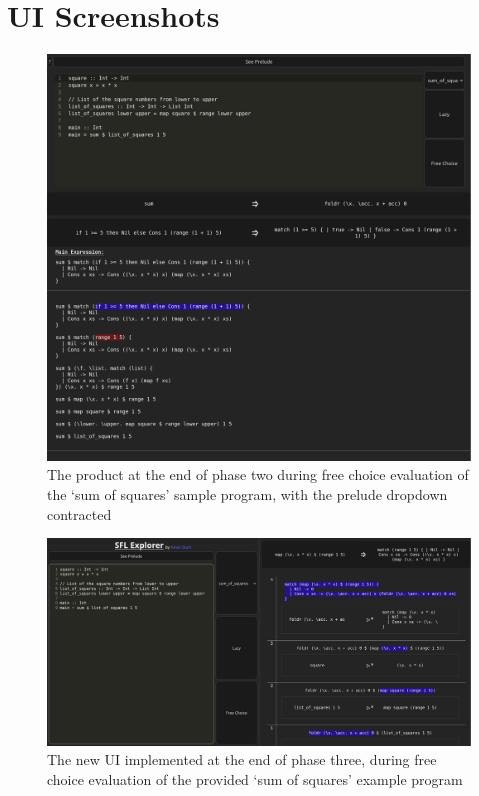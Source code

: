\chapter{UI Screenshots}
\begin{figure}[h]
    \centering
    \includegraphics[width=1\linewidth]{images/phase-2-end3.png} 
    \captionsetup{justification=centering}
    \caption{The product at the end of phase two during free choice evaluation of the `sum of squares' sample program, with the prelude dropdown contracted}
    \label{fig:screenshot_c2_end_free}
\end{figure}

\begin{figure}[h]
    \centering
    \includegraphics[width=\linewidth]{images/phase-3-end-free.png}
    \caption{The new UI implemented at the end of phase three, during free choice evaluation of the provided `sum of squares' example program}
    \label{screenshot:phase3_end_free}
\end{figure}

